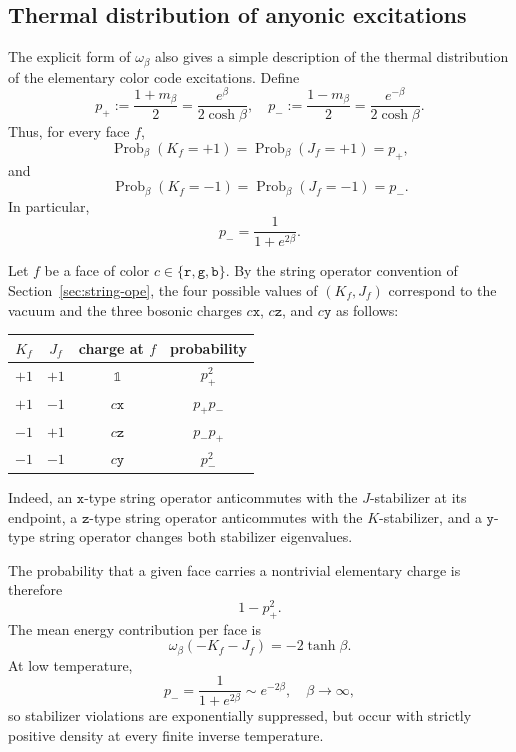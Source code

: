 \documentclass[a4paper,11pt]{article}
\theoremstyle{definition}
\theoremstyle{remark}
\theoremstyle{remark}
\begin{document}
\subsection{Thermal distribution of anyonic excitations}

The explicit form of $\omega_\beta$ also gives a simple description of the thermal distribution of the elementary color code excitations. Define
\begin{equation}\label{eq:p_pm}
    p_+ := \frac{1+m_\beta}{2} = \frac{e^\beta}{2\cosh\beta}, \quad p_- := \frac{1-m_\beta}{2} = \frac{e^{-\beta}}{2\cosh\beta}.
\end{equation}
Thus, for every face $f$,
\[
    \operatorname{Prob}_\beta(K_f=+1) = \operatorname{Prob}_\beta(J_f=+1) = p_+,
\]
and
\[
    \operatorname{Prob}_\beta(K_f=-1) = \operatorname{Prob}_\beta(J_f=-1) = p_-.
\]
In particular,
\begin{equation}\label{eq:thermal_violation_density}
    p_- = \frac{1}{1+e^{2\beta}}.
\end{equation}

Let $f$ be a face of color $c\in\{\mathtt r,\mathtt g,\mathtt b\}$. By the string operator convention of Section~\ref{sec:string-ope}, the four possible values of $(K_f,J_f)$ correspond to the vacuum and the three bosonic charges $c\mathtt x$, $c\mathtt z$, and $c\mathtt y$ as follows:
\begin{center}
\begin{tabular}{c|c|c|c}
    \toprule
    $K_f$ & $J_f$ & charge at $f$ & probability \\ \hline
    $+1$ & $+1$ & $\mathds{1}$ & $p_+^2$ \\
    $+1$ & $-1$ & $c\mathtt x$ & $p_+p_-$ \\
    $-1$ & $+1$ & $c\mathtt z$ & $p_-p_+$ \\
    $-1$ & $-1$ & $c\mathtt y$ & $p_-^2$ \\
    \bottomrule
\end{tabular}
\end{center}
Indeed, an $\mathtt{x}$-type string operator anticommutes with the $J$-stabilizer at its endpoint, a $\mathtt{z}$-type string operator anticommutes with the $K$-stabilizer, and a $\mathtt{y}$-type string operator changes both stabilizer eigenvalues.

The probability that a given face carries a nontrivial elementary charge is therefore
\begin{equation}\label{eq:thermal_anyon_probability}
    1-p_+^2.
\end{equation}
The mean energy contribution per face is
\begin{equation}\label{eq:thermal_energy_face}
    \omega_\beta(-K_f-J_f) = -2\tanh\beta.
\end{equation}
At low temperature,
\[
    p_- = \frac{1}{1+e^{2\beta}} \sim e^{-2\beta}, \quad \beta\to\infty,
\]
so stabilizer violations are exponentially suppressed, but occur with strictly positive density at every finite inverse temperature.
\end{document}
